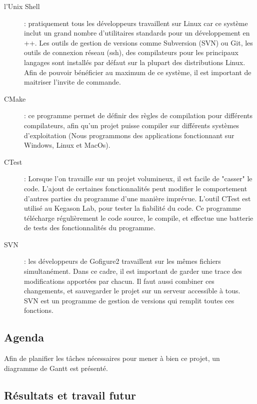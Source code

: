 \begin{description}
  \item[l'Unix Shell] : pratiquement tous les développeurs travaillent sur Linux
  car ce système inclut un grand nombre d'utilitaires
  standards pour un développement en {\C++}.
  Les outils de gestion de versions comme Subversion (SVN) ou Git, les outils de connexion réseau (ssh),
  des compilateurs pour les principaux langages sont installés par défaut sur la
  plupart des distributions Linux.
  Afin de pouvoir bénéficier au maximum de ce système, il est important de maitriser
  l'invite de commande.
  \item[CMake] : ce programme permet de définir des règles de compilation pour différents compilateurs, afin qu'un projet puisse
   compiler sur différents systèmes d'exploitation (Nous programmons des applications fonctionnant sur Windows, Linux et MacOs).
  \item[CTest] : Lorsque l'on travaille sur un projet volumineux, il est facile de "casser" le code. L'ajout de certaines fonctionnalités 
  peut modifier le comportement d'autres parties du programme d'une manière imprévue. L'outil CTest est utilisé au Kegason Lab, 
  pour tester la fiabilité du code. Ce programme télécharge régulièrement le code source, le compile, et effectue une batterie de tests
  des fonctionnalités du programme.
  \item[SVN] : les développeurs de Gofigure2 travaillent sur les mêmes fichiers simultanément. 
  Dans ce cadre, il est important de garder une trace des modifications apportées par chacun. Il faut aussi combiner ces changements, 
  et sauvegarder le projet sur un serveur accessible à tous. SVN est un programme de gestion de versions qui remplit toutes ces 
  fonctions.
\end{description}


\subsection{Agenda}

Afin de planifier les tâches nécessaires pour mener à bien ce projet, un diagramme de Gantt est présenté.

\subsection{Résultats et travail futur}

